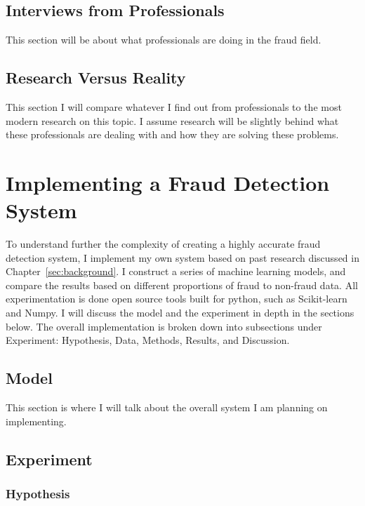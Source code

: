 \documentclass[midd]{thesis}
\begin{document}
\section{ Interviews from Professionals}

This section will be about what professionals are doing in the fraud field.

\section{ Research Versus Reality}

This section I will compare whatever I find out from professionals to the most modern research on this topic. I assume research will be slightly behind what these professionals are dealing with and how they are solving these problems.


\pagebreak
\chapter{Implementing a Fraud Detection System}
\label{sec:impl}

To understand further the complexity of creating a highly accurate fraud detection system, I implement my own system based on past research discussed in Chapter~\ref{sec:background}. I construct a series of machine learning models, and compare the results based on different proportions of fraud to non-fraud data. All experimentation is done open source tools built for python, such as Scikit-learn and Numpy. I will discuss the model and the experiment in depth in the sections below. The overall implementation is broken down into subsections under Experiment: Hypothesis, Data, Methods, Results, and Discussion. 

\section{Model}

This section is where I will talk about the overall system I am planning on implementing.

\section{Experiment}

\subsection{Hypothesis}
\end{document}

